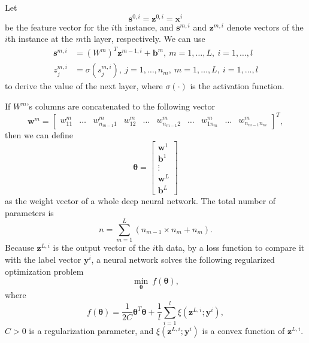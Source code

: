 \documentclass[12pt]{article}
\def\bx{{\boldsymbol x}}
\def\by{{\boldsymbol y}}
\def\bb{{\boldsymbol b}}
\def\bw{{\boldsymbol w}}
\def\bs{{\boldsymbol s}}
\def\bz{{\boldsymbol z}}
\def\btheta{\boldsymbol \theta}
\begin{document}
Let 
\begin{equation*}
\label{input-data}
\bs^{0,i} = \bz^{0,i} = \bx^i
\end{equation*}
be the feature vector for the $i$th instance, and $\bs^{m,i}$ and $\bz^{m,i}$ denote vectors 
of the $i$th instance at the $m$th layer, respectively. We can use 
\begin{align}
       \bs^{m,i} &= (W^m)^T \bz^{m-1,i} + \bb^m,\ m=1,\ldots,L,\ i=1,\ldots,l \nonumber\\
       z_j^{m,i} &= \sigma(s^{m,i}_j),\ j=1,\ldots,n_m,\ m = 1,\ldots,L,\ i=1,\ldots,l\label{xtoz}
\end{align}
to derive the value of the next layer, where $\sigma(\cdot)$ is the activation function.

If $W^m$'s columns are concatenated to the following vector
\begin{equation*}
\bw^m = \begin{bmatrix} w^m_{11} & \ldots & w^m_{n_{m-1}1} & w^m_{12} & \ldots & w^m_{n_{m-1}2} & \ldots & w^m_{1n_{m}} & \ldots & w^m_{n_{m-1}n_{m}} \end{bmatrix}^T,
\end{equation*}
then we can define
\begin{equation*}
	\btheta = \begin{bmatrix} \bw^1 \\ \bb^1 \\ \vdots \\ \bw^L \\ \bb^L\end{bmatrix}
\end{equation*}
as the weight vector of a whole deep neural network. The total number of parameters is 
\begin{equation*}
	n = \sum_{m=1}^L \left(n_{m-1} \times n_m + n_m\right).
\end{equation*}
Because $\bz^{L,i}$ is the output vector of the $i$th data, by a loss function to compare it with
the label vector $\by^i$, a neural network solves the following regularized optimization problem
\begin{equation*}
\label{square-loss}
\min_{\btheta}\ f(\btheta),
\end{equation*}
where
\begin{equation}
\label{obj-function}
f(\btheta) = \frac{1}{2C} \btheta^T\btheta + \frac{1}{l} \sum_{i=1}^{l} \xi(\bz^{L,i};\by^i),
\end{equation}
$C > 0$ is a regularization parameter, and $\xi(\bz^{L,i};\by^i)$ is a convex function of $\bz^{L,i}$. 
\end{document}
